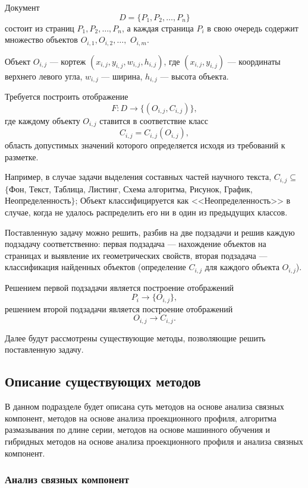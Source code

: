 Документ
$$
D = \{ P_1, P_2 , \dots, P_n \}
$$
состоит из страниц $ P_1, P_2, \dots, P_n $, а каждая страница $ P_i $
в свою очередь содержит множество объектов $ O_{i,1}, O_{i,2}, \dots, $ $O_{i,m} $.

Объект $O_{i,j}$ --- кортеж $(x_{i,j}, y_{i,j}, w_{i,j}, h_{i,j})$, где $(x_{i,j}, y_{i,j})$ --- координаты верхнего левого угла, $w_{i,j}$ --- ширина, $h_{i,j}$ --- высота объекта.

Требуется построить отображение
$$ F : D \to \{(O_{i,j}, C_{i,j})\}, $$
где каждому объекту $O_{i,j}$ ставится в соответствие класс
$$ C_{i,j} = C_{i,j}(O_{i,j}), $$
область допустимых значений которого определяется исходя из требований к разметке.

Например, в случае задачи выделения составных частей научного текста, $C_{i,j} \subseteq$ $\{${Фон, Текст, Таблица, Листинг, Схема алгоритма, Рисунок, График, Неопределенность}$\}$;
Объект классифицируется как <<Неопределенность>> в случае, когда не удалось распределить его ни в один из предыдущих классов.

Поставленную задачу можно решить, разбив на две подзадачи и решив каждую подзадачу соответственно: первая подзадача --- нахождение объектов на страницах и выявление их геометрических свойств, вторая подзадача --- классификация найденных объектов (определение $C_{i,j}$ для каждого объекта $O_{i,j}$).

Решением первой подзадачи является построение отображений
$$
P_i \to \{ O_{i,j} \},
$$
решением второй подзадачи является построение отображений
$$
O_{i,j} \to C_{i,j}.
$$

Далее будут рассмотрены существующие методы, позволяющие решить поставленную задачу.

\subsection{Описание существующих методов}


В данном подразделе будет описана суть методов на основе анализа связных компонент, методов на основе анализа проекционного профиля, алгоритма размазывания по длине серии, методов на основе машинного обучения и гибридных методов на основе анализа проекционного профиля и анализа связных компонент.

\subsubsection{Анализ связных компонент}

